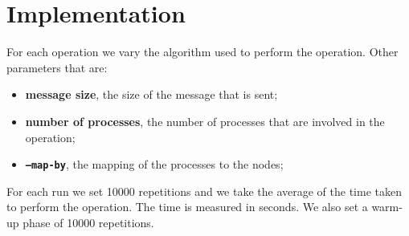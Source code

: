 \section{Implementation}

For each operation we vary the algorithm used to perform the operation. Other parameters that are:
\begin{itemize}
    \item \textbf{message size}, the size of the message that is sent;
    \item \textbf{number of processes}, the number of processes that are involved in the operation;
    \item \textbf{\texttt{--map-by}}, the mapping of the processes to the nodes;
\end{itemize}

For each run we set 10000 repetitions and we take the average of the time taken to perform the operation. The time is measured in seconds. We also set a warm-up phase of 10000 repetitions.

